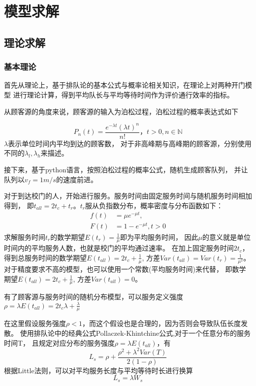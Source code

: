 \documentclass{article}
\begin{document}
\section{模型求解}

\subsection{理论求解}

\subsubsection{基本理论}
    首先从理论上，基于排队论的基本公式与概率论相关知识，在理论上对两种开门模型
    进行理论计算，得到平均队长与平均等待时间作为评价通行效率的指标。

    从顾客源的角度来说，顾客源的输入为泊松过程，泊松过程的概率表达式如下

    \begin{equation}
        P_n(t)=\frac{e^{-\lambda t}(\lambda t)^n}{n!}，t>0,n \in \mathbb{N}
    \end{equation}
    $\lambda$表示单位时间内平均到达的顾客数，
    对于非高峰期与高峰期的顾客源，分别使用不同的$\lambda_l,\lambda_h$来描述。

    接下来，基于python语言，按照泊松过程的概率公式，随机生成顾客队列，
    并让队列以$v_f=1 m/s$的速度前进。

    对于到达校门的人，开始进行服务。服务时间由固定服务时间与随机服务时间相加得到，
    即$t_{all}=2t_{c}+t_{r}$。$t_r$服从负指数分布，概率密度与分布函数如下：
    \begin{equation}
        \begin{aligned}
            f(t) &=\mu e^{-\mu t},  \\
            F(t) &=1-e^{-\mu t},t>0
        \end{aligned}
    \end{equation}
    求解服务时间$t_r$的数学期望$E(t_r)=\frac{1}{\mu}$即为平均服务时间，
    因此$\mu$的意义就是单位时间内的平均服务人数，也就是校门的平均通过速率。
    在加上固定服务时间$2t_c$，得到总服务时间的数学期望$E(t_{all})=2t_c+\frac{1}{\mu}$,
    方差$ Var(t_{all})=Var(t_r)=\frac{1}{\mu^2}$。
    对于精度要求不高的模型，也可以使用一个常数(平均服务时间)来代替，
    即数学期望$E(t_{all})=2t_c+\frac{1}{\mu}$,
    方差$ Var(t_{all})=0$。

    有了顾客源与服务时间的随机分布模型，可以服务定义强度
    $\rho=\lambda E(t_{all})=2t_c \lambda+\frac{\lambda}{\mu}$

    在这里假设服务强度$\rho<1$，而这个假设也是合理的，因为否则会导致队伍长度发散。
    使用排队论中的经典公式Pollaczek-Khintchine公式,对于一个任意分布的服务时间T，
    且规定对应分布的服务强度$\rho=\lambda E(t_{all})$，有
    \begin{equation}
        L_s=\rho +\frac{\rho^2 +\lambda^2 Var(T)}{2(1-\rho)}
    \end{equation}
    根据Little法则，可以对平均服务长度与平均等待时长进行换算
    \begin{equation}
        L_s=\lambda W_s
    \end{equation}
\end{document}

